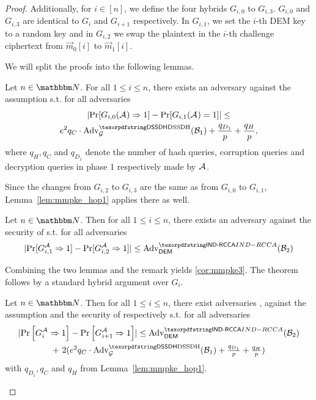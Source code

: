 \begin{proof}
  Additionally, for $i\in[n]$, we define the four hybrids $G_{i,0}$ to $G_{i,3}$. $G_{i,0}$ and $G_{i,3}$ are identical
  to $G_i$ and $G_{i+1}$ respectively. In $G_{i,1}$, we set the $i$-th DEM key to a random key and in $G_{i,2}$ we swap
  the plaintext in the $i$-th challenge ciphertext from $\vec{m}_0[i]$ to $\vec{m}_1[i]$.

  We will split the proofs into the following lemmas.
  \begin{lemma}\label{lem:mmpke_hop1}
    Let $n\in\N$. For all $1\leq i \le n$, there exists an adversary \Bdv[1] against the \sdh assumption s.t. for all adversaries \Adv
    \begin{multline*}
      \abs{\Pr[G_{i,0}(\Adv)\Rightarrow 1]- \Pr[G_{i,1}({\Adv}) = 1]} \leq \\
      e^2q_C\cdot\adv{\sdh}{\Group}({\Bdv[1]}) + \frac{q_{D_1}}{p} + \frac{q_H}{p},
    \end{multline*}
    where $q_H, q_C$ and $q_{D_1}$ denote the number of hash queries, corruption queries and decryption queries in phase
    1 respectively made by $\mathcal{A}_{\relax}$.
  \end{lemma}
  \begin{remark}
    Since the changes from $G_{i,2}$ to $G_{i,3}$ are the same as from $G_{i,0}$ to $G_{i,1}$, Lemma~\ref{lem:mmpke_hop1} applies there as
    well.
  \end{remark}

  \begin{lemma}\label{lem:mmpke_hop2}
    Let $n\in\N$. Then for all $1\leq i \le n$, there exists an adversary \Bdv[2] against the \indrcca security of \dem s.t. for all adversaries \Adv
    \[
      \abs{\Pr[G_{i,1}^{\Adv}\Rightarrow 1]-\Pr[G_{i,2}^{\Adv}\Rightarrow 1]} \leq \adv{\indrcca}{\dem}({\Bdv[2]})
    \]
  \end{lemma}

  Combining the two lemmas and the remark yields \cref{cor:mmpke3}. The theorem follows by a standard hybrid
  argument over $G_i$.

  \begin{corollary}\label{cor:mmpke3}
    Let $n\in\N$. Then for all $1\leq i \le n$, there exist adversaries \Bdv[1], \Bdv[2] against the \sdh assumption and
    the \indrcca security of \dem respectively s.t. for all adversaries \Adv
    \begin{multline*}
      \abs{\Pr\left[G_i^{\Adv}\Rightarrow 1\right] - \Pr\left[G_{i+1}^{\Adv}\Rightarrow 1\right]} \leq  \adv{\indrcca}{\dem}({\Bdv[2]}) \\
      \begin{array}{c}
        +\ 2(e^2q_C\cdot\adv{\sdh}{\Group}({\Bdv[1]}) + \frac{q_{D_1}}{p} + \frac{q_H}{p}) \\
      \end{array}
    \end{multline*}
    with $q_{D_1}, q_C$ and $q_H$ from Lemma~\ref{lem:mmpke_hop1}.
  \end{corollary}


\end{proof}
